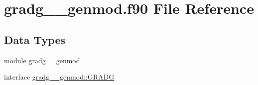 \hypertarget{gradg____genmod_8f90}{\section{gradg\+\_\+\+\_\+genmod.\+f90 File Reference}
\label{gradg____genmod_8f90}
}
\subsection*{Data Types}
\begin{DoxyCompactItemize}
\item 
module \hyperlink{classgradg____genmod}{gradg\+\_\+\+\_\+genmod}
\item 
interface \hyperlink{interfacegradg____genmod_1_1GRADG}{gradg\+\_\+\+\_\+genmod\+::\+G\+R\+A\+D\+G}
\end{DoxyCompactItemize}
